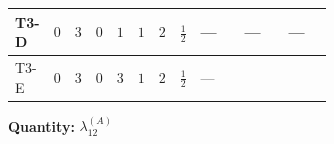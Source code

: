 \documentclass[8pt]{article}
\begin{document}
\begin{landscape}
\begin{longtable}{@{}llcccccc >{\raggedright\arraybackslash}p{0.21\linewidth} >{\raggedright\arraybackslash}p{0.21\linewidth} >{\raggedright\arraybackslash}p{0.21\linewidth}@{}}
\midrule
T3-D & $0$ & $3$ & $0$ & $1$ & $1$ & $2$ & $\frac{1}{2}$ & --- & --- & --- \\
\midrule
T3-E & $0$ & $3$ & $0$ & $3$ & $1$ & $2$ & $\frac{1}{2}$ & --- & \scriptsize\adjustbox{max width=\linewidth}{$\begin{gathered} +\frac{2}{3} \operatorname{Tr}\!\left({y_1}\,\left({y_1}\right)^{\dagger}\,{y_2}\,\left({y_2}\right)^{\dagger}\right)\end{gathered}$} & \scriptsize\adjustbox{max width=\linewidth}{$\begin{gathered} -\frac{2}{9} {\lambda_5} \left({\lambda_5}\right)^{*}\end{gathered}$} \\
\midrule
\bottomrule
\end{longtable}
\clearpage
\noindent\textbf{Quantity: }$\lambda_{12}^{(A)}$\par\smallskip

\end{landscape}
\end{document}
